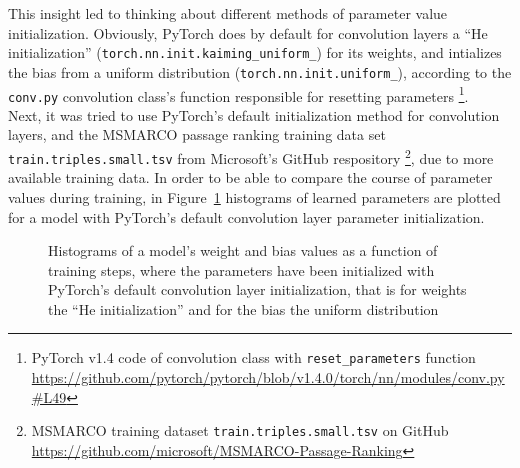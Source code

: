 This insight led to thinking about different methods of parameter value initialization.
Obviously, PyTorch does by default for convolution layers a 
    “He initialization” (\texttt{torch.nn.init.kaiming\_uniform\_}) for its weights,
    and intializes the bias from a uniform distribution (\texttt{torch.nn.init.uniform\_}),
    according to the \texttt{conv.py} convolution class's function
    responsible for resetting parameters
    \footnote{PyTorch v1.4 code of convolution class with \texttt{reset\_parameters} function \url{https://github.com/pytorch/pytorch/blob/v1.4.0/torch/nn/modules/conv.py\#L49}}.\\
Next, it was tried to use PyTorch's default initialization method for convolution layers,
    and the MSMARCO passage ranking training data set \texttt{train.triples.small.tsv} from Microsoft's 
    GitHub respository
    \footnote{MSMARCO training dataset \texttt{train.triples.small.tsv} on GitHub \url{https://github.com/microsoft/MSMARCO-Passage-Ranking}},
    due to more available training data.
In order to be able to compare the course of parameter values during training,
    in Figure~\ref{fig:2020-09-29:histogram-parameter-default-init} histograms
    of learned parameters are plotted for a model with PyTorch's default convolution
    layer parameter initialization.

\begin{figure}[htbp]
\centering
\caption[Histogram of model parameter values as a function of training steps and initialization using PyTorch's default for convultion layers]{Histograms of a model's weight and bias values as a function of training steps, where the parameters have been initialized with PyTorch's default convolution layer initialization, that is for weights the “He initialization” and for the bias the uniform distribution}
\label{fig:2020-09-29:histogram-parameter-default-init}
\end{figure}

